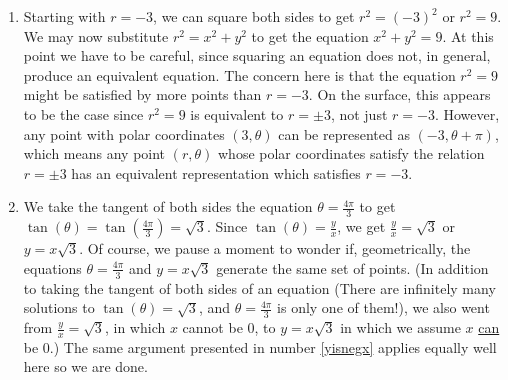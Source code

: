 {\begin{enumerate}
\begin{enumerate}

\item Starting with $r = -3$, we can square both sides to get  $r^2 = (-3)^2$ or $r^2 = 9$.  We may now substitute $r^2 = x^2+y^2$ to get the equation $x^2+y^2 = 9$.  At this point we have to be careful, since squaring an equation does not, in general, produce an equivalent equation.  The concern here is that the equation $r^2 = 9$ might be satisfied by more points than $r = -3$.  On the surface, this appears to be the case since $r^2 = 9$ is equivalent to $r = \pm 3$, not just $r=-3$.  However, any point with polar coordinates $(3,\theta)$ can be represented as $(-3,\theta + \pi)$, which means any point $(r,\theta)$ whose polar coordinates satisfy the relation $r = \pm 3$ has an equivalent representation which satisfies $r=-3$.


\item  We take the tangent of both sides the equation $\theta = \frac{4\pi}{3}$ to get $\tan(\theta) = \tan\left(\frac{4\pi}{3}\right) = \sqrt{3}$.  Since $\tan(\theta) = \frac{y}{x}$, we get $\frac{y}{x} = \sqrt{3}$ or $y = x\sqrt{3}$.  Of course, we pause a moment to wonder if, geometrically, the equations $\theta = \frac{4\pi}{3}$ and $y = x\sqrt{3}$ generate the same set of points. (In addition to taking the tangent of both sides of an equation (There are infinitely many solutions to $\tan(\theta) = \sqrt{3}$, and $\theta = \frac{4\pi}{3}$ is only one of them!), we also went from $\frac{y}{x} = \sqrt{3}$, in which $x$ cannot be $0$, to $y = x\sqrt{3}$ in which we assume $x$ \underline{can} be $0$.)  The same argument presented in number \ref{yisnegx} applies equally well here so we are done.


\end{enumerate}
\end{enumerate}}
